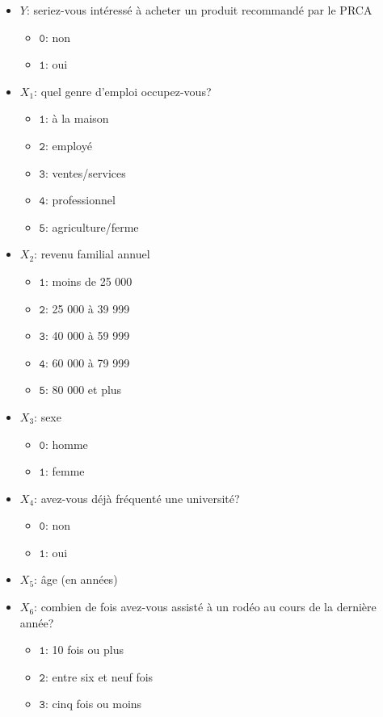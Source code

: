 \documentclass[
  11pt,
  letterpaper,
]{book}
\providecommand{\tightlist}{%
  \setlength{\itemsep}{0pt}\setlength{\parskip}{0pt}}
\theoremstyle{definition}
\theoremstyle{definition}
\theoremstyle{definition}
\theoremstyle{definition}
\theoremstyle{remark}
\begin{document}
\begin{itemize}
\tightlist
\item
  \(Y\): seriez-vous intéressé à acheter un produit recommandé par le PRCA

  \begin{itemize}
  \tightlist
  \item
    \(\texttt{0}\): non
  \item
    \(\texttt{1}\): oui
  \end{itemize}
\item
  \(X_1\): quel genre d'emploi occupez-vous?

  \begin{itemize}
  \tightlist
  \item
    \(\texttt{1}\): à la maison
  \item
    \(\texttt{2}\): employé
  \item
    \(\texttt{3}\): ventes/services
  \item
    \(\texttt{4}\): professionnel
  \item
    \(\texttt{5}\): agriculture/ferme
  \end{itemize}
\item
  \(X_2\): revenu familial annuel

  \begin{itemize}
  \tightlist
  \item
    \(\texttt{1}\): moins de 25 000
  \item
    \(\texttt{2}\): 25 000 à 39 999
  \item
    \(\texttt{3}\): 40 000 à 59 999
  \item
    \(\texttt{4}\): 60 000 à 79 999
  \item
    \(\texttt{5}\): 80 000 et plus
  \end{itemize}
\item
  \(X_3\): sexe

  \begin{itemize}
  \tightlist
  \item
    \(\texttt{0}\): homme
  \item
    \(\texttt{1}\): femme
  \end{itemize}
\item
  \(X_4\): avez-vous déjà fréquenté une université?

  \begin{itemize}
  \tightlist
  \item
    \(\texttt{0}\): non
  \item
    \(\texttt{1}\): oui
  \end{itemize}
\item
  \(X_5\): âge (en années)
\item
  \(X_6\): combien de fois avez-vous assisté à un rodéo au cours de la dernière année?

  \begin{itemize}
  \tightlist
  \item
    \(\texttt{1}\): 10 fois ou plus
  \item
    \(\texttt{2}\): entre six et neuf fois
  \item
    \(\texttt{3}\): cinq fois ou moins
  \end{itemize}
\end{itemize}
\end{document}
